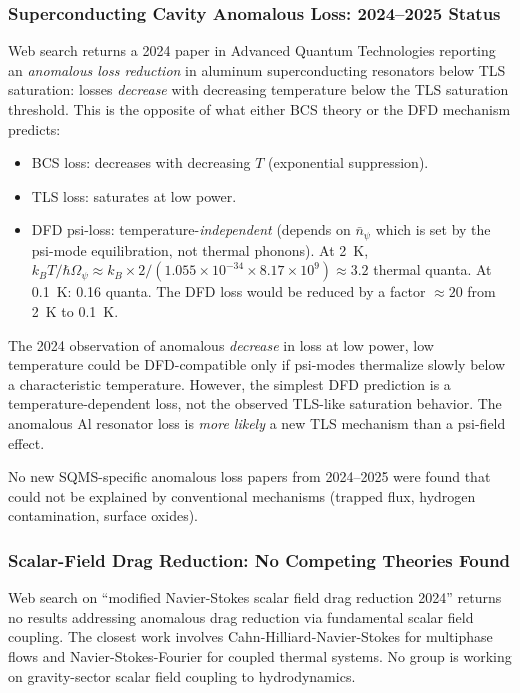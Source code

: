 \documentclass[11pt,twocolumn]{article}
\newcommand{\Opsi}{\Omega_\psi}
\begin{document}
\subsubsection{Superconducting Cavity Anomalous Loss: 2024--2025 Status}

Web search returns a 2024 paper in Advanced Quantum Technologies
reporting an \emph{anomalous loss reduction} in aluminum superconducting
resonators below TLS saturation: losses \emph{decrease} with decreasing
temperature below the TLS saturation threshold. This is the opposite of
what either BCS theory or the DFD mechanism predicts:
\begin{itemize}[noitemsep]
\item BCS loss: decreases with decreasing $T$ (exponential suppression).
\item TLS loss: saturates at low power.
\item DFD psi-loss: temperature-\emph{independent} (depends on $\bar{n}_\psi$
  which is set by the psi-mode equilibration, not thermal phonons).
  At 2~K, $k_BT/\hbar\Opsi \approx k_B\times2/(1.055\times10^{-34}
  \times8.17\times10^9) \approx 3.2$ thermal quanta. At 0.1~K: 0.16 quanta.
  The DFD loss would be reduced by a factor $\approx 20$ from 2~K to 0.1~K.
\end{itemize}

The 2024 observation of anomalous \emph{decrease} in loss at low power,
low temperature could be DFD-compatible only if psi-modes thermalize
slowly below a characteristic temperature. However, the simplest DFD
prediction is a temperature-dependent loss, not the observed TLS-like
saturation behavior. The anomalous Al resonator loss is \emph{more likely}
a new TLS mechanism than a psi-field effect.

No new SQMS-specific anomalous loss papers from 2024--2025 were found that
could not be explained by conventional mechanisms (trapped flux, hydrogen
contamination, surface oxides).

\subsubsection{Scalar-Field Drag Reduction: No Competing Theories Found}

Web search on ``modified Navier-Stokes scalar field drag reduction 2024'' returns
no results addressing anomalous drag reduction via fundamental scalar field
coupling. The closest work involves Cahn-Hilliard-Navier-Stokes for
multiphase flows and Navier-Stokes-Fourier for coupled thermal systems.
No group is working on gravity-sector scalar field coupling to hydrodynamics.
\end{document}
